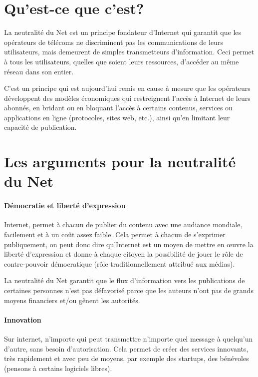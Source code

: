 \documentclass[12pt]{../fiche}
\begin{document}

\section{Qu'est-ce que c'est?}\label{kezako}

La neutralité du Net est un principe fondateur d'Internet qui garantit
que les opérateurs de télécoms ne discriminent pas les communications de
leurs utilisateurs, mais demeurent de simples transmetteurs
d'information. Ceci permet à tous les utilisateurs, quelles que
soient leurs ressources, d'accéder au même réseau dans son entier.

C'est un principe qui est aujourd'hui remis en cause à mesure que les
opérateurs développent des modèles économiques qui restreignent l'accès
à Internet de leurs abonnés, en bridant ou en bloquant l'accès à
certains contenus, services ou applications en ligne (protocoles, sites
web, etc.), ainsi qu'en limitant leur capacité de publication.

\section{Les arguments pour la neutralité du Net}

\paragraph{Démocratie et liberté d'expression}
Internet, permet à chacun de publier du contenu avec une audiance
mondiale, facilement et à un coût assez faible.
Cela permet à chacun de s'exprimer publiquement, on peut donc dire qu'Internet
est un moyen de mettre en \oe uvre la liberté d'expression et donne à chaque
citoyen la possibilité de jouer le rôle de contre-pouvoir démocratique
(rôle traditionnellement attribué aux médias).

La neutralité du Net garantit que le flux d'information vers les publications
de certaines personnes n'est pas défavorisé parce que les auteurs n'ont pas
de grands moyens financiers et/ou gênent les autorités.

\paragraph{Innovation}
Sur internet, n'importe qui peut transmettre n'importe quel message
à quelqu'un d'autre, sans besoin d'autorisation.
Cela permet de créer des services innovants, très rapidement et avec
peu de moyens, par exemple des startups, des bénévoles (pensons à certains
logiciels libres).
\end{document}
